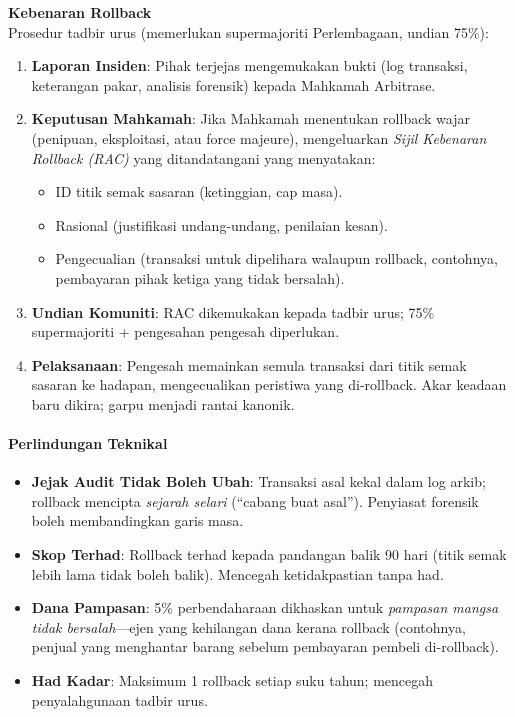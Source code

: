 \documentclass[11pt]{article}
\begin{document}
\textbf{Kebenaran Rollback}\\
Prosedur tadbir urus (memerlukan supermajoriti Perlembagaan, undian 75\%):
\begin{enumerate}[noitemsep]
  \item \textbf{Laporan Insiden}: Pihak terjejas mengemukakan bukti (log transaksi, keterangan pakar, analisis forensik) kepada Mahkamah Arbitrase.
  \item \textbf{Keputusan Mahkamah}: Jika Mahkamah menentukan rollback wajar (penipuan, eksploitasi, atau force majeure), mengeluarkan \emph{Sijil Kebenaran Rollback (RAC)} yang ditandatangani yang menyatakan:
    \begin{itemize}[noitemsep]
      \item ID titik semak sasaran (ketinggian, cap masa).
      \item Rasional (justifikasi undang-undang, penilaian kesan).
      \item Pengecualian (transaksi untuk dipelihara walaupun rollback, contohnya, pembayaran pihak ketiga yang tidak bersalah).
    \end{itemize}
  \item \textbf{Undian Komuniti}: RAC dikemukakan kepada tadbir urus; 75\% supermajoriti + pengesahan pengesah diperlukan.
  \item \textbf{Pelaksanaan}: Pengesah memainkan semula transaksi dari titik semak sasaran ke hadapan, mengecualikan peristiwa yang di-rollback. Akar keadaan baru dikira; garpu menjadi rantai kanonik.
\end{enumerate}

\paragraph{Perlindungan Teknikal}
\begin{itemize}[noitemsep]
  \item \textbf{Jejak Audit Tidak Boleh Ubah}: Transaksi asal kekal dalam log arkib; rollback mencipta \emph{sejarah selari} (``cabang buat asal''). Penyiasat forensik boleh membandingkan garis masa.
  \item \textbf{Skop Terhad}: Rollback terhad kepada pandangan balik 90 hari (titik semak lebih lama tidak boleh balik). Mencegah ketidakpastian tanpa had.
  \item \textbf{Dana Pampasan}: 5\% perbendaharaan dikhaskan untuk \emph{pampasan mangsa tidak bersalah}—ejen yang kehilangan dana kerana rollback (contohnya, penjual yang menghantar barang sebelum pembayaran pembeli di-rollback).
  \item \textbf{Had Kadar}: Maksimum 1 rollback setiap suku tahun; mencegah penyalahgunaan tadbir urus.
\end{itemize}
\end{document}
